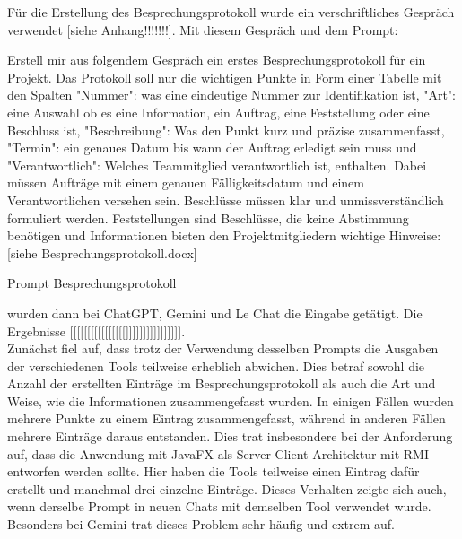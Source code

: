 Für die Erstellung des Besprechungsprotokoll wurde ein verschriftliches Gespräch verwendet [siehe Anhang!!!!!!!]. Mit 
diesem Gespräch und dem Prompt:
    
\begin{prompt}[H]
    \begin{tcolorbox}[colback=gray!20, colframe=gray!20, boxrule=0pt, sharp corners] 
        Erstell mir aus folgendem Gespräch ein erstes Besprechungsprotokoll für ein Projekt. Das Protokoll soll nur 
        die wichtigen Punkte in Form einer Tabelle mit den Spalten "Nummer": was eine eindeutige Nummer zur 
        Identifikation ist, "Art": eine Auswahl ob es eine Information, ein Auftrag, eine Feststellung oder eine 
        Beschluss ist, "Beschreibung": Was den Punkt kurz und präzise zusammenfasst, "Termin": ein genaues Datum bis 
        wann der Auftrag erledigt sein muss und "Verantwortlich": Welches Teammitglied verantwortlich ist, enthalten. 
        Dabei müssen Aufträge mit einem genauen Fälligkeitsdatum und einem Verantwortlichen versehen sein. Beschlüsse 
        müssen klar und unmissverständlich formuliert werden. Feststellungen sind Beschlüsse, die keine Abstimmung 
        benötigen und Informationen bieten den Projektmitgliedern wichtige Hinweise: 
        [siehe Besprechungsprotokoll.docx]
        \vfill
    \end{tcolorbox}
    \caption{Prompt Besprechungsprotokoll}
    \label{Prompt Besprechungsprotokoll}
\end{prompt}

wurden dann bei ChatGPT, Gemini und Le Chat die Eingabe getätigt. Die Ergebnisse [[[[[[[[[[[[[[[[]]]]]]]]]]]]]]]].\\

Zunächst fiel auf, dass trotz der Verwendung desselben Prompts die Ausgaben der verschiedenen Tools teilweise erheblich abwichen. 
Dies betraf sowohl die Anzahl der erstellten Einträge im Besprechungsprotokoll als auch die Art und Weise, wie die Informationen 
zusammengefasst wurden. In einigen Fällen wurden mehrere Punkte zu einem Eintrag zusammengefasst, während in anderen Fällen mehrere 
Einträge daraus entstanden. Dies trat insbesondere bei der Anforderung auf, dass die Anwendung mit JavaFX als Server-Client-Architektur 
mit RMI entworfen werden sollte. Hier haben die Tools teilweise einen Eintrag dafür erstellt und manchmal drei einzelne Einträge. 
Dieses Verhalten zeigte sich auch, wenn derselbe Prompt in neuen Chats mit demselben Tool verwendet wurde. Besonders bei Gemini trat 
dieses Problem sehr häufig und extrem auf.\\

